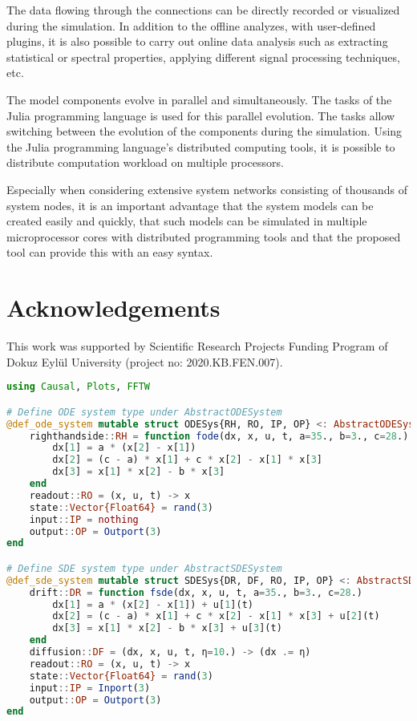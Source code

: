 \documentclass{juliacon}
\begin{document}
{The data flowing through the connections can be directly recorded or visualized during the simulation. In addition to the offline analyzes, with user-defined plugins, it is also possible to carry out online data analysis such as extracting statistical or spectral properties, applying different signal processing techniques, etc. 

The model components evolve in parallel and simultaneously. The tasks of the Julia programming language is used for this parallel evolution. The tasks allow switching between the evolution of the components during the simulation. Using the Julia programming language's distributed computing tools, it is possible to distribute computation workload on multiple processors.

Especially when considering extensive system networks consisting of thousands of system nodes, it is an important advantage that the system models can be created easily and quickly, that such models can be simulated in multiple microprocessor cores with distributed programming tools and that the proposed tool can provide this with an easy syntax.

\section{Acknowledgements}
This work was supported by Scientific Research Projects Funding Program of Dokuz Eylül University  (project no: 2020.KB.FEN.007).



\onecolumn
\appendix 

\begin{lstlisting}[caption={Program using Causal.jl for the simulation of the system in Figure \ref{fig: coupled model}. Plots.jl is used to plot the simulation data while FFTW.jl is used to compute the FFT of the simulation data \cite{plots, fftw}.}, label={lst: coupled codes}, language=Julia]
using Causal, Plots, FFTW

# Define ODE system type under AbstractODESystem
@def_ode_system mutable struct ODESys{RH, RO, IP, OP} <: AbstractODESystem
    righthandside::RH = function fode(dx, x, u, t, a=35., b=3., c=28.)
        dx[1] = a * (x[2] - x[1])
        dx[2] = (c - a) * x[1] + c * x[2] - x[1] * x[3]
        dx[3] = x[1] * x[2] - b * x[3]
    end
    readout::RO = (x, u, t) -> x 
    state::Vector{Float64} = rand(3)
    input::IP = nothing
    output::OP = Outport(3)
end

# Define SDE system type under AbstractSDESystem
@def_sde_system mutable struct SDESys{DR, DF, RO, IP, OP} <: AbstractSDESystem
    drift::DR = function fsde(dx, x, u, t, a=35., b=3., c=28.)
        dx[1] = a * (x[2] - x[1]) + u[1](t)
        dx[2] = (c - a) * x[1] + c * x[2] - x[1] * x[3] + u[2](t)
        dx[3] = x[1] * x[2] - b * x[3] + u[3](t)
    end
    diffusion::DF = (dx, x, u, t, η=10.) -> (dx .= η) 
    readout::RO = (x, u, t) -> x
    state::Vector{Float64} = rand(3)
    input::IP = Inport(3)
    output::OP = Outport(3)
end


\end{lstlisting}}
\end{document}
